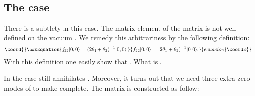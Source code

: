 \documentclass[a4paper,a4paper]{article}
\begin{document}
\subsection{The \coordHE{} case}

There is a subtlety in this case. The matrix element
\coordHE{} of the matrix \coordHE{} is not
well-defined on the vacuum \coordHE{}. We remedy this
arbitrariness by the following definition:
\begin{equation}\coord{}\boxEquation{
f_{22}|0,0\rangle=(2\theta_1+\theta_2)^{-1}|0,0\rangle.
}{
f_{22}|0,0\rangle=(2\theta_1+\theta_2)^{-1}|0,0\rangle.
}{ecuacion}\coordE{}\end{equation}
With this definition one easily show that \coordHE{}.
What is \coordHE{}.

In the \coordHE{} case \coordHE{} still annihilates \coordHE{}.
Moreover, it turns out that we need three extra zero modes of
\myHighlight{$\Delta^\dag$}\coordHE{} to make \coordHE{} complete. The matrix \coordHE{} is
constructed as follow:
\end{document}
